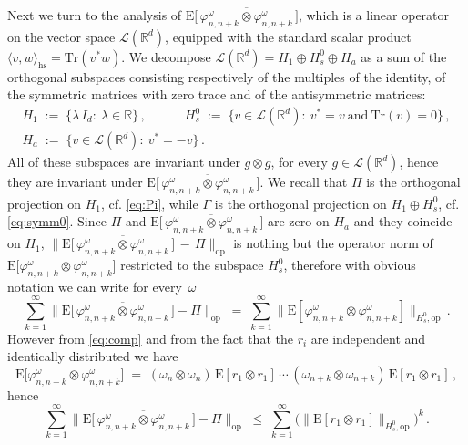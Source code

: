 \documentclass[a4paper,reqno,11pt]{amsart}
\numberwithin{equation}{section}
\newcommand{\cL}{{\ensuremath{\mathcal L}} }
\newcommand{\gl}{\lambda}
\newcommand{\go}{\omega}
\newcommand{\R}{\mathbb{R}}
\def\bE{\ensuremath{\bs{\mathrm{E}}}}
\def\bs{\boldsymbol}
\renewcommand{\phi}{\varphi}
\begin{document}
Next we turn to the analysis of
$\bE \big[\, \overline{\phi^\go_{n,n+k} \otimes \phi^\go_{n,n+k}} \,\big]$,
which is a linear operator on the vector space $\cL(\R^d)$,
equipped with the standard scalar product
$\langle v, w \rangle_{\text{hs}} = \text{Tr}(v^* w)$.
We decompose $\cL(\R^d) = H_1 \oplus H_s^0 \oplus H_a$ as a sum of
the orthogonal subspaces consisting respectively of the multiples of the identity,
of the symmetric matrices with zero trace and of the antisymmetric matrices:
\begin{gather*}
	H_1 \;:=\; \big\{ \gl\, I_d : \ \gl \in \R \big\} \,, \qquad \quad
	H_s^0 \;:=\; \big\{ v \in \cL(\R^d): \ v^* = v \ \text{and} \ \text{Tr}(v) = 0 \big\}\,,\\
	H_a \;:=\; \big\{ v \in \cL(\R^d): \ v^* = -v \big\} \,.
\end{gather*}
All of these subspaces are invariant under $g \otimes g$, for every $g \in \cL(\R^d)$,
hence they are invariant under $\bE \big[\, \overline{\phi^\go_{n,n+k} \otimes \phi^\go_{n,n+k}} \,\big]$.
We recall that $\Pi$ is the orthogonal projection on $H_1$, cf. \eqref{eq:Pi},
while $\Gamma$ is the orthogonal projection on $H_1 \oplus H_s^0$, cf. \eqref{eq:symm0}.
Since $\Pi$ and $\bE \big[\, \overline{\phi^\go_{n,n+k} \otimes \phi^\go_{n,n+k}} \,\big]$
are zero on $H_a$ and they coincide on $H_1$,
$\big\| \bE \big[\, \overline{\phi^\go_{n,n+k} \otimes \phi^\go_{n,n+k}} \,\big]
\, -\, \Pi \big\|_{\text{op}}$ is nothing but the operator norm of
$\bE \big[\phi^\go_{n,n+k} \otimes \phi^\go_{n,n+k}\big]$
restricted to the subspace $H_s^0$, therefore with obvious notation we can write
for every~$\go$
\begin{equation}
	\sum_{k=1}^\infty \big\| \bE \big[\,
	\overline{\phi^\go_{n,n+k} \otimes \phi^\go_{n,n+k}} \,\big] -
	\Pi \big\|_{\text{op}} \;=\; \sum_{k=1}^\infty
	\big\| \bE [\phi^\go_{n,n+k} \otimes \phi^\go_{n,n+k}] \big\|_{H_s^0, \text{op}} \,.
\end{equation}
However from \eqref{eq:comp} and from the fact that the $r_i$ are independent and identically
distributed we have
\begin{equation} \label{eq:multip}
	\bE \big[ \phi^\go_{n,n+k} \otimes \phi^\go_{n,n+k}\big]
	\;=\; (\go_n \otimes \go_n) \, \bE[ r_1 \otimes r_1] \, \cdots \,
	(\go_{n+k} \otimes \go_{n+k}) \, \bE[ r_1 \otimes r_1] \,,
\end{equation}
hence
\begin{equation} \label{eq:analogy3}
	\sum_{k=1}^\infty \big\| \bE \big[\,
	\overline{\phi^\go_{n,n+k} \otimes \phi^\go_{n,n+k}} \,\big]
	- \Pi \big\|_{\text{op}}
	\;\le\; \sum_{k=1}^\infty
	\big( \big\| \bE[ r_1 \otimes r_1] \big\|_{H_s^0, \text{op}}\big)^k \,.
\end{equation}
\end{document}
